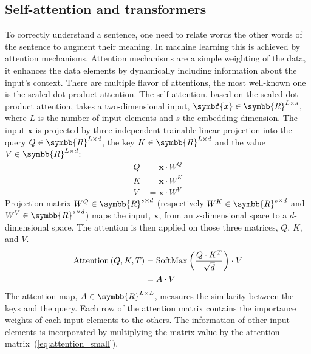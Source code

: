 \documentclass[../main.tex]{subfiles}
\begin{document}
 \subsection{Self-attention and transformers}
	 To correctly understand a sentence, one need to relate words the other words of the sentence to augment their meaning.
	 In machine learning this is achieved by attention mechanisms.
	 Attention mechanisms are a simple weighting of the data, it enhances the data elements by dynamically including information about the input's context.
	 There are multiple flavor of attentions, the most well-known one is the scaled-dot product attention.
	 The self-attention, based on the scaled-dot product attention, takes a two-dimensional input, \(\symbf{x} \in \symbb{R}^{L\times s}\), where \(L\) is the number of input elements and \(s\) the embedding dimension.
	 The input \(\symbf{x}\) is projected by three independent trainable linear projection into the query \(Q \in \symbb{R}^{L \times d}\), the key \(K \in \symbb{R}^{L \times d}\) and the value \(V \in \symbb{R}^{L \times d}\):
	 \begin{align}
		 Q & = \symbf{x}\cdot W^{Q} \\
		 K & = \symbf{x}\cdot W^{K} \\
		 V & = \symbf{x}\cdot W^{V}
	 \end{align}
	 Projection matrix \(W^Q \in \symbb{R}^{s \times d} \) (respectively \(W^K\in \symbb{R}^{s \times d}\) and \(W^V\in \symbb{R}^{s \times d}\)) maps the input, \(\symbf{x}\), from an \(s\)-dimensional space to a \(d\)-dimensional space.
	 The attention is then applied on those three matrices, \(Q\), \(K\), and \(V\).
	 \begin{align}
		 \operatorname{Attention}\left(Q,K,T\right) & = \operatorname{SoftMax}\left( \frac{Q\cdot K^T}{\sqrt{d}}\right) \cdot V\label{eq:selfattention} \\
		                                            & = A \cdot V \label{eq:attention_small}
	 \end{align}
	 The attention map, \(A \in \symbb{R}^{L \times L}\), measures the similarity between the keys and the query.
	 Each row of the attention matrix contains the importance weights of each input elements to the others.
	 The information of other input elements is incorporated by multiplying the matrix value by the attention matrix~(\cref{eq:attention_small}).
\end{document}
